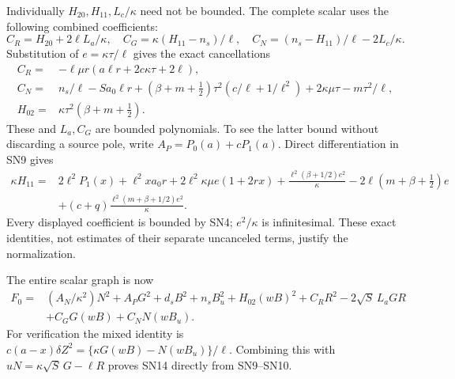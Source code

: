 Individually $H_{20},H_{11},L_c/\kappa$ need not be bounded.
The complete scalar uses the following combined coefficients:
\[
 C_R=H_{20}+2\ell L_a/\kappa,\quad
 C_G=\kappa(H_{11}-n_s)/\ell,\quad
 C_N=(n_s-H_{11})/\ell-2L_c/\kappa.
 \tag{SN11}
\]
Substitution of $e=\kappa\tau/\ell$ gives the exact cancellations
\[
\begin{split}
 C_R={}&-\ell\mu r(a\ell r+2c\kappa\tau+2\ell),\\
 C_N={}&n_s/\ell-Sa_0\ell r
       +(\beta+m+\tfrac12)\tau^2(c/\ell+1/\ell^2)
                   +2\kappa\mu\tau-m\tau^2/\ell,\\
 H_{02}={}&\kappa\tau^2(\beta+m+\tfrac12).
\end{split}\tag{SN12}
\]
These and $L_a,C_G$ are bounded polynomials. To see the latter
bound without discarding a source pole, write
$A_P=P_0(a)+cP_1(a)$. Direct differentiation in SN9 gives
\[
\begin{split}
 \kappa H_{11}={}&2\ell^2P_1(x)+\ell^2x a_0r
 +2\ell^2\kappa\mu e(1+2rx)
 +\frac{\ell^2(\beta+1/2)e^2}{\kappa}
 -2\ell(m+\beta+\tfrac12)e\\
 &+(c+q)\frac{\ell^2(m+\beta+1/2)e^2}{\kappa}.
\end{split}\tag{SN13}
\]
Every displayed coefficient is bounded by SN4; $e^2/\kappa$ is
infinitesimal. These exact identities, not estimates of their separate
uncanceled terms, justify the normalization.

The entire scalar graph is now
\[
\begin{split}
 F_0={}&(A_N/\kappa^2)N^2+A_PG^2+d_sB^2+n_sB_u^2
       +H_{02}(wB)^2+C_RR^2-2\sqrt S\,L_aGR\\
 &+C_GG(wB)+C_NN(wB_u).
\end{split}\tag{SN14}
\]
For verification the mixed identity is
$c(a-x)\delta Z^2=\{\kappa G(wB)-N(wB_u)\}/\ell$.
Combining this with $uN=\kappa\sqrt S\,G-\ell R$ proves
SN14 directly from SN9--SN10.

